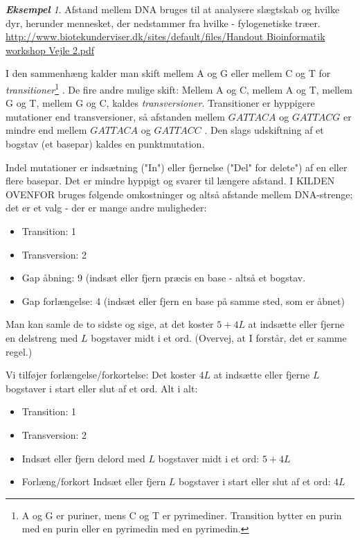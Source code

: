 \documentclass[a4paper, 12pt]{article}
\theoremstyle{remark}
\newtheorem{Eksempel}{\textbf{Eksempel}}
\begin{document}
\begin{Eksempel}
Afstand mellem DNA bruges til at analysere slægtskab og hvilke dyr, herunder mennesket, der nedstammer fra hvilke - fylogenetiske træer.\\ \url{ http://www.biotekunderviser.dk/sites/default/files/Handout Bioinformatik workshop Vejle 2.pdf}

I den sammenhæng kalder man skift mellem A og G eller mellem C og T for \emph{transitioner}\footnote{A og G er puriner, mens C og T er pyrimediner. Transition bytter en purin med en purin eller en pyrimedin med en pyrimedin.} . De fire andre mulige skift: Mellem A og C, mellem A og T, mellem G og T, mellem G og C, kaldes \emph{transversioner}. Transitioner er hyppigere mutationer end transversioner, så afstanden mellem $GATTACA$ og $GATTACG$ er mindre end mellem $GATTACA$ og $GATTACC$ . Den slags udskiftning af et bogstav (et basepar) kaldes en punktmutation.

Indel mutationer er indsætning ("In") eller fjernelse ("Del" for delete") af en eller flere basepar. Det er mindre hyppigt og svarer til længere afstand. I  KILDEN OVENFOR bruges følgende omkostninger og altså afstande mellem DNA-strenge; det er et valg - der er mange andre muligheder: 
\begin{itemize}
\item Transition: 1
\item Transversion: 2
\item Gap åbning: 9 (indsæt eller fjern præcis en base - altså et bogstav.
\item Gap forlængelse: 4 (indsæt eller fjern en base på samme sted, som er åbnet)
\end{itemize}
Man kan samle de to sidste og sige, at det koster $5+4L$ at indsætte eller fjerne en delstreng med $L$ bogstaver midt i et ord. (Overvej, at I forstår, det er samme regel.)

Vi tilføjer forlængelse/forkortelse: Det koster $4L$ at indsætte eller fjerne $L$ bogstaver i start eller slut af et ord.  Alt i alt:
\begin{itemize}
\item Transition: 1
\item Transversion: 2
\item Indsæt eller fjern delord med $L$ bogstaver midt i et ord: $5+4L$
\item Forlæng/forkort Indsæt eller fjern $L$ bogstaver i start eller slut af et ord: $4L$
\end{itemize}
\end{Eksempel}
\end{document}
